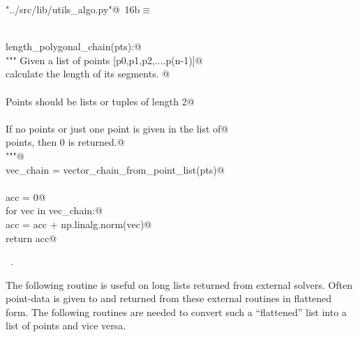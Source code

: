\documentclass[11.5pt]{report}
\begin{document}
\begin{flushleft} \small\label{scrap7}\raggedright\small
{} \verb@"../src/lib/utils_algo.py"@\nobreak\ {\footnotesize {16b}}$\equiv$
\vspace{-1ex}
\begin{list}{}{} \item
\mbox{}\verb@@\\
\mbox{}\verb@def length_polygonal_chain(pts):@\\
\mbox{}\verb@    """ Given a list of points [p0,p1,p2,....p(n-1)]@\\
\mbox{}\verb@    calculate the length of its segments. @\\
\mbox{}\verb@@\\
\mbox{}\verb@    Points should be lists or tuples of length 2@\\
\mbox{}\verb@@\\
\mbox{}\verb@    If no points or just one point is given in the list of@\\
\mbox{}\verb@    points, then 0 is returned.@\\
\mbox{}\verb@    """@\\
\mbox{}\verb@    vec_chain = vector_chain_from_point_list(pts)@\\
\mbox{}\verb@@\\
\mbox{}\verb@    acc = 0@\\
\mbox{}\verb@    for vec in vec_chain:@\\
\mbox{}\verb@        acc = acc + np.linalg.norm(vec)@\\
\mbox{}\verb@    return acc@\\
\mbox{}\verb@@{\NWsep}
\end{list}
\vspace{-1.5ex}
\footnotesize
\begin{list}{}{\setlength{\itemsep}{-\parsep}\setlength{\itemindent}{-\leftmargin}}
\item \NWtxtFileDefBy\ .

\item{}
\end{list}
\vspace{4ex}
\end{flushleft}
\newchunk The following routine is useful on long lists returned from external solvers. 
Often point-data is given to and returned from these external routines in flattened
form. The following routines are needed to convert such a ``flattened'' list into 
a list of points and vice versa. 
\end{document}

